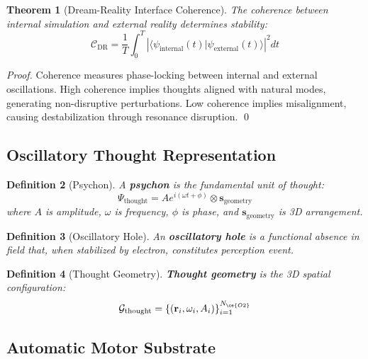 \documentclass[12pt,twocolumn]{article}
\newtheorem{theorem}{Theorem}[section]
\newtheorem{definition}[theorem]{Definition}
\theoremstyle{remark}
\begin{document}
\begin{theorem}[Dream-Reality Interface Coherence]
\label{thm:interface_coherence}
The coherence between internal simulation and external reality determines stability:
\begin{equation}
\mathcal{C}_{\text{DR}} = \frac{1}{T}\int_0^T \left|\langle \psi_{\text{internal}}(t) | \psi_{\text{external}}(t) \rangle\right|^2 dt
\end{equation}
\end{theorem}

\begin{proof}
Coherence measures phase-locking between internal and external oscillations. High coherence implies thoughts aligned with natural modes, generating non-disruptive perturbations. Low coherence implies misalignment, causing destabilization through resonance disruption. \qed
\end{proof}

\subsection{Oscillatory Thought Representation}

\begin{definition}[Psychon]
A \textbf{psychon} is the fundamental unit of thought:
\begin{equation}
\Psi_{\text{thought}} = A e^{i(\omega t + \phi)} \otimes \mathbf{s}_{\text{geometry}}
\end{equation}
where $A$ is amplitude, $\omega$ is frequency, $\phi$ is phase, and $\mathbf{s}_{\text{geometry}}$ is 3D  arrangement.
\end{definition}

\begin{definition}[Oscillatory Hole]
An \textbf{oscillatory hole} is a functional absence in  field that, when stabilized by electron, constitutes perception event.
\end{definition}

\begin{definition}[Thought Geometry]
\textbf{Thought geometry} is the 3D spatial configuration:
\begin{equation}
\mathcal{G}_{\text{thought}} = \{(\mathbf{r}_i, \omega_i, A_i)\}_{i=1}^{N_{\ce{O2}}}
\end{equation}
\end{definition}

\subsection{Automatic Motor Substrate}
\end{document}
